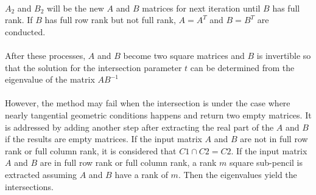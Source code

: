 \paragraph{}
$A_2$ and $B_2$ will be the new $A$ and $B$ matrices for next iteration until $B$ has full rank.
If $B$ has full row rank but not full rank, $A=A^T$ and $B=B^T$ are conducted.
\paragraph{}
After these processes, $A$ and $B$ become two square matrices and $B$ is invertible so that the solution for the intersection parameter $t$ can be determined from the eigenvalue of the matrix $AB^{-1}$
\paragraph{}
However, the method may fail when the intersection is under the case where nearly tangential geometric conditions happens and return two empty matrices.
It is addressed by adding another step after extracting the real part of the $A$ and $B$ if the results are empty matrices\citep{Shen2016}.
If the input matrix $A$ and $B$ are not in full row rank or full column rank, it is considered that $C1 \cap C2 = C2$.
If the input matrix $A$ and $B$ are in full row rank or full column rank, a rank $m$ square sub-pencil is extracted assuming $A$ and $B$ have a rank of $m$.
Then the eigenvalues yield the intersections.
